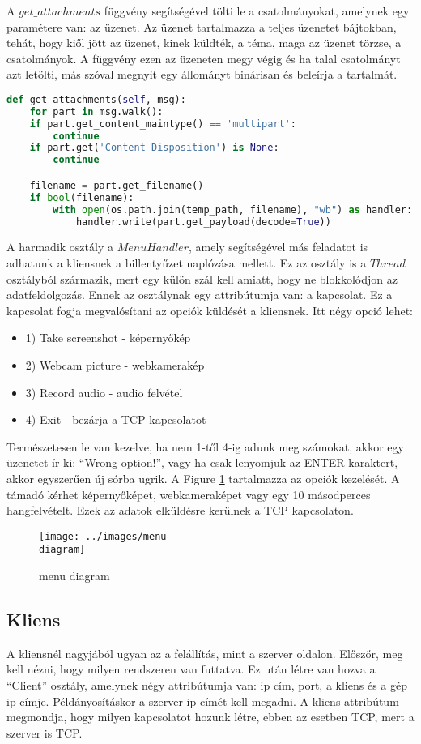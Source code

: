 \documentclass[a4paper, 11pt]{article}
\begin{document}
A $get\_attachments$ függvény segítségével tölti le a csatolmányokat, amelynek egy paramétere van: az üzenet. Az üzenet tartalmazza a teljes üzenetet bájtokban, tehát, hogy kiől jött az üzenet, kinek küldték, a téma, maga az üzenet törzse, a csatolmányok. A függvény ezen az üzeneten megy végig és ha talal csatolmányt azt letölti, más szóval megnyit egy állományt binárisan és beleírja a tartalmát.
\begin{lstlisting}[language=Python]
def get_attachments(self, msg):
	for part in msg.walk():
	if part.get_content_maintype() == 'multipart':
		continue
	if part.get('Content-Disposition') is None:
		continue

	filename = part.get_filename()
	if bool(filename):
		with open(os.path.join(temp_path, filename), "wb") as handler:
			handler.write(part.get_payload(decode=True))
\end{lstlisting}

A harmadik osztály a $MenuHandler$, amely segítségével más feladatot is adhatunk a kliensnek a billentyűzet naplózása mellett. Ez az osztály is a $Thread$ osztályból származik, mert egy külön szál kell amiatt, hogy ne blokkolódjon az adatfeldolgozás. Ennek az osztálynak egy attribútumja van: a kapcsolat. Ez a kapcsolat fogja megvalósítani az opciók küldését a kliensnek. Itt négy opció lehet:
\begin{itemize}
\item 1) Take screenshot - képernyőkép
\item 2) Webcam picture - webkamerakép
\item 3) Record audio - audio felvétel
\item 4) Exit - bezárja a TCP kapcsolatot
\end{itemize}
Természetesen le van kezelve, ha nem 1-től 4-ig adunk meg számokat, akkor egy üzenetet ír ki: ``Wrong option!'', vagy ha csak lenyomjuk az ENTER karaktert, akkor egyszerűen új sórba ugrik. A Figure \ref{fig:menudia} tartalmazza az opciók kezelését. A támadó kérhet képernyőképet, webkameraképet vagy egy 10  másodperces hangfelvételt. Ezek az adatok elküldésre kerülnek a TCP kapcsolaton.
\begin{figure}[H]
\centering
\texttt{[image: ../images/menu\\ diagram]}
\caption{menu diagram}
\label{fig:menudia}
\end{figure}

\subsection{Kliens}\label{subsec:client}
A kliensnél nagyjából ugyan az a felállítás, mint a szerver oldalon. Előszőr, meg kell nézni, hogy milyen rendszeren van futtatva. Ez után létre van hozva a ``Client'' osztály, amelynek négy attribútumja van: ip cím, port, a kliens és a gép ip címje. Példányosításkor a szerver ip címét kell megadni. A kliens attribútum megmondja, hogy milyen kapcsolatot hozunk létre, ebben az esetben TCP, mert a szerver is TCP.
\end{document}

